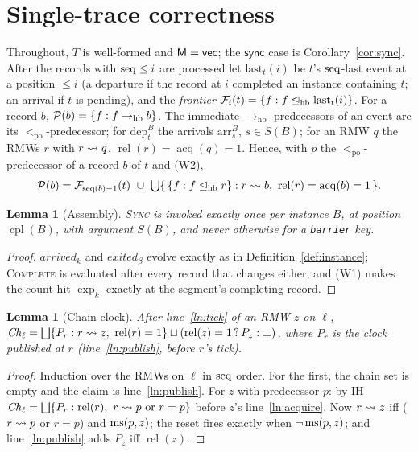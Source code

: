 \documentclass[11pt]{article}
\newtheorem{lemma}[theorem]{Lemma}
\theoremstyle{remark}
\DeclareMathOperator{\rel}{rel}\DeclareMathOperator{\acq}{acq}\DeclareMathOperator{\key}{key}
\DeclareMathOperator{\cpl}{cpl}\DeclareMathOperator{\Exec}{Exec}\DeclareMathOperator{\rf}{rf}
\newcommand{\PO}{<_{\mathrm{po}}}\newcommand{\HB}{\to_{\mathrm{hb}}}\newcommand{\HBr}{\trianglelefteq_{\mathrm{hb}}}
\newcommand{\arr}[2]{\mathrm{arr}^{#2}_{#1}}\newcommand{\dep}[2]{\mathrm{dep}^{#2}_{#1}}\newcommand{\ext}[1]{\mathrm{exit}_{#1}}
\newcommand{\arrv}{\mathit{arrived}}\newcommand{\gone}{\mathit{exited}}\newcommand{\Rep}{\mathit{Rep}}
\begin{document}
\section{Single-trace correctness}\label{sec:single}

Throughout, $T$ is well-formed and $\mathsf{M}=\mathsf{vec}$; the $\mathsf{sync}$ case is
Corollary~\ref{cor:sync}. After the records with $\operatorname{seq}\le i$ are processed let
$\mathrm{last}_t(i)$ be $t$'s $\operatorname{seq}$-last event at a position $\le i$ (a departure if the
record at $i$ completed an instance containing $t$; an arrival if $t$ is pending), and the
\emph{frontier} $\Fr_i(t)=\{f:f\HBr\mathrm{last}_t(i)\}$. For a record $b$,
$\Pred(b)=\{f:f\HB b\}$. The immediate $\HB$-predecessors of an event are its
$\PO$-predecessor; for $\dep{t}{B}$ the arrivals $\arr{s}{B}$, $s\in S(B)$; for an RMW $q$
the RMWs $r$ with $r\rightsquigarrow q$, $\rel(r)=\acq(q)=1$. Hence, with $p$ the $\PO$-predecessor of
a record $b$ of $t$ and (W2),
\begin{equation}\label{eq:pred}
\Pred(b)=\Fr_{\seq(b)-1}(t)\ \cup\ \textstyle\bigcup\{\,\{f:f\HBr r\}: r\chain b,\ \rel(r)=\acq(b)=1\,\}.
\end{equation}

\begin{lemma}[Assembly]\label{lem:assembly}
\textsc{Sync} is invoked exactly once per instance $B$, at position $\cpl(B)$, with
argument $S(B)$, and never otherwise for a \texttt{barrier} key.
\end{lemma}
\begin{proof}
$\arrv_k$ and $\gone_\beta$ evolve exactly as in Definition~\ref{def:instance};
\textsc{Complete} is evaluated after every record that changes either, and (W1) makes the
count hit $\exp_k$ exactly at the segment's completing record.
\end{proof}

\begin{lemma}[Chain clock]\label{lem:chain}
After line~\ref{ln:tick} of an RMW $z$ on $\ell$,
$\Ch_\ell=\bigsqcup\{P_r: r\chain z,\ \rel(r)=1\}\sqcup(\rel(z)=1\,?\,P_z:\bot)$, where
$P_r$ is the clock published at $r$ (line~\ref{ln:publish}, before $r$'s tick).
\end{lemma}
\begin{proof}
Induction over the RMWs on $\ell$ in $\operatorname{seq}$ order. For the first, the chain set is empty
and the claim is line~\ref{ln:publish}. For $z$ with predecessor $p$: by IH
$\Ch_\ell=\bigsqcup\{P_r:\rel(r),\ r\chain p\text{ or }r=p\}$ before $z$'s
line~\ref{ln:acquire}. Now $r\rightsquigarrow z$ iff ($r\rightsquigarrow p$ or $r=p$) and $\operatorname{ms}(p,z)$; the
reset fires exactly when $\neg\operatorname{ms}(p,z)$; and line~\ref{ln:publish} adds $P_z$ iff
$\rel(z)$.
\end{proof}
\end{document}
